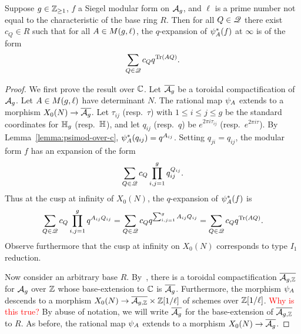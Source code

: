 \documentclass{amsart}
\begin{document}
\begin{lemma}\label{lemma:q-expansion}
  Suppose  $g \in \mathbb{Z}_{\ge 1}$, $f$ a Siegel modular form on $\mathcal{A}_g$, and $\ell$ is a prime number not equal to the characteristic of the base ring $R$. 
  Then for all $Q\in \mathscr{Q}$ there exist $c_Q \in R$ such that for all $A \in M(g,\ell)$, the $q$-expansion of 
  $\psi_{A}^*(f)$ at $\infty$ is of the form
  \[
    \sum_{Q \in \mathscr{Q}} c_Q q^{\operatorname{Tr}(AQ)}.
  \]
\end{lemma}

\begin{proof}
  We first prove the result over $\mathbb{C}$. Let $\overline{\mathcal{A}_g}$ be a toroidal compactification of $\mathcal{A}_g$. Let $A \in M(g,\ell)$ have determinant $N$. The rational map $\psi_{A}$ extends to a morphism $X_0(N) \to \overline{\mathcal{A}_g}$. Let $\tau_{ij}$ (resp.~$\tau$) with $1 \leq i \leq j \leq g$ be the standard coordinates for $\mathbb{H}_g$ (resp.~$\mathbb{H}$), and let $q_{ij}$ (resp.~$q$) be $e^{2\pi i \tau_{ij}}$ (resp.~$e^{2\pi i \tau}$). By Lemma~\ref{lemma:psimod-over-c}, $\psi_{A}^*(q_{ij}) = q^{A_{ij}}$. Setting $q_{ji} = q_{ij}$, the modular form $f$ has an expansion of the form
    \[
      \sum_{Q \in \mathscr{Q}} c_Q \prod_{i,j=1}^g q_{ij}^{Q_{ij}}.
    \]
    Thus at the cusp at infinity of $X_0(N)$, the $q$-expansion of $\psi_{A}^*(f)$ is
    $$\sum_{Q \in \mathscr{Q}} c_Q \prod_{i,j=1}^g q^{A_{ij}Q_{ij}} = \sum_{Q \in \mathscr{Q}} c_Q q^{\sum_{i,j=1}^g A_{ij}Q_{ij}} 
    = \sum_{Q \in \mathscr{Q}} c_Q q^{\operatorname{Tr}(AQ)}.$$
  Observe furthermore that the cusp at infinity on $X_0(N)$ corresponds to type $I_1$ reduction. %

  Now consider an arbitrary base $R$. By~\cite[IV.5.15]{faltings1990degeneration}, there is a toroidal compactification $\overline{\mathcal{A}_{g,\mathbb{Z}}}$ for $\mathcal{A}_g$ over $\mathbb{Z}$ whose base-extension to $\mathbb{C}$ is $\overline{\mathcal{A}_g}$. Furthermore, the morphism $\psi_{A}$ descends to a morphism $X_0(N) \to \overline{\mathcal{A}_{g,\mathbb{Z}}} \times \mathbb{Z}[1/\ell]$ of schemes over $\mathbb{Z}[1/\ell]$. \textcolor{red}{Why is this true?} By abuse of notation, we will write $\overline{\mathcal{A}_g}$ for the base-extension of $\overline{\mathcal{A}_{g,\mathbb{Z}}}$ to $R$. As before, the rational map $\psi_{A}$ extends to a morphism $X_0(N) \to \overline{\mathcal{A}_g}$.
  

\end{proof}
\end{document}
